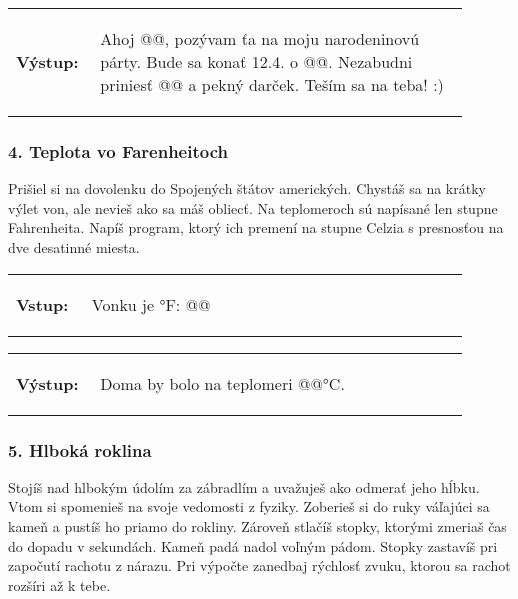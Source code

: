 \vspace{-2em}
\begin{tabular}{@{}p{0.15\linewidth}p{0.75\linewidth}}
\textbf{\small Výstup:} &
\vspace{-3em}
\begin{code}
Ahoj @\fbox{\phantom{vstup}}@,
pozývam ťa na moju narodeninovú párty.
Bude sa konať 12.4. o @\fbox{\phantom{vstup}}@.
Nezabudni priniesť @\fbox{\phantom{vstup}}@ a pekný darček.
Teším sa na teba! :)
\end{code}
\end{tabular}
\vspace{-2em}

\subsubsection*{4. Teplota vo Farenheitoch}
Prišiel si na dovolenku do Spojených štátov amerických. Chystáš sa na krátky výlet von, ale nevieš ako sa máš obliecť. Na teplomeroch sú napísané len stupne Fahrenheita. Napíš program, ktorý ich premení na stupne Celzia s presnosťou na dve desatinné miesta.

\begin{tabular}{@{}p{0.15\linewidth}p{0.75\linewidth}}
\textbf{\small Vstup:} &
\vspace{-3em}
\begin{code}
Vonku je °F: @\fbox{\phantom{vstup}}@
\end{code}
\end{tabular}

\vspace{-2em}
\begin{tabular}{@{}p{0.15\linewidth}p{0.75\linewidth}}
\textbf{\small Výstup:} &
\vspace{-3em}
\begin{code}
Doma by bolo na teplomeri @\fbox{\phantom{vstup}}@°C.
\end{code}
\end{tabular}
\vspace{-2em}

\subsubsection*{5. Hlboká roklina}
Stojíš nad hlbokým údolím za zábradlím a uvažuješ ako odmerať jeho hĺbku. Vtom si spomenieš na svoje vedomosti z fyziky. Zoberieš si do ruky váľajúci sa kameň a pustíš ho priamo do rokliny. Zároveň stlačíš stopky, ktorými zmeriaš čas do dopadu v sekundách. Kameň padá nadol voľným pádom. Stopky zastavíš pri započutí rachotu z nárazu. Pri výpočte zanedbaj rýchlosť zvuku, ktorou sa rachot rozšíri až k tebe.

